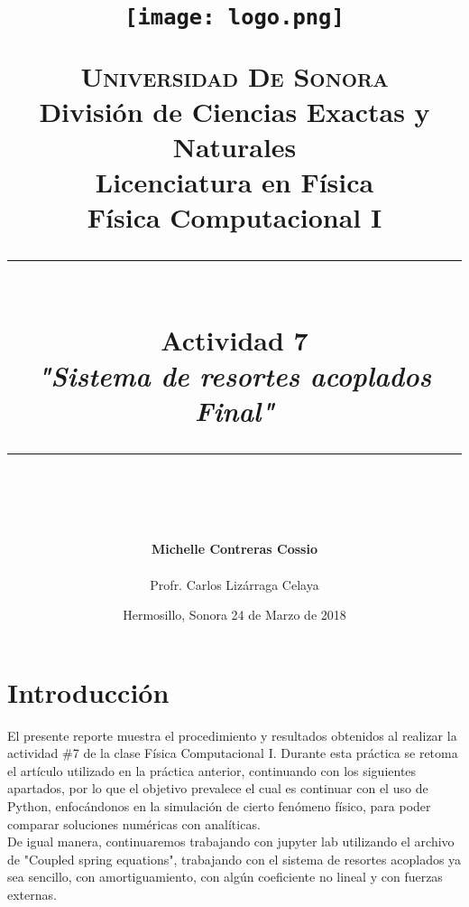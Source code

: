 \documentclass[12pt]{article}
\newcommand{\HRule}[1]{\rule{\linewidth}{#1}}
\begin{document}
\begin{titlepage}

\title{ \normalsize 
        \begin{center}
        \texttt{[image: logo.png]}
        \end{center}
        \LARGE \textsc{\textbf{Universidad De Sonora}} \\ \bigskip
		\Large División de Ciencias Exactas y Naturales \\
        Licenciatura en Física \\ \bigskip
        \bigskip
        Física Computacional I
		\\ [0.1cm]  
		\HRule{2pt} \\
		\Large \textbf{{Actividad 7}} \\
        \textit{\textbf{"Sistema de resortes acoplados Final"}}
		\HRule{2pt} \\
		\normalsize \vspace*{0.001\baselineskip}}
        
\date{\bigskip \Large Hermosillo, Sonora  \hspace*{\fill}  24 de Marzo de 2018}

        
\author{
		\Large\textbf{ Michelle Contreras Cossio} \\ \bigskip
        \\ \bigskip
       \Large Profr. Carlos Lizárraga Celaya}
       \end{titlepage}
       \maketitle
       

\newpage
\pagestyle{plain}

\section{Introducción}
El presente reporte muestra el procedimiento y resultados obtenidos al realizar la actividad \#7 de la clase Física Computacional I.  Durante esta práctica se retoma el artículo utilizado en la práctica anterior, continuando con los siguientes apartados, por lo que el objetivo prevalece el cual es continuar con el uso de Python, enfocándonos en la simulación de cierto fenómeno físico, para poder comparar soluciones numéricas con analíticas. \\

De igual manera, continuaremos trabajando con jupyter lab utilizando el archivo de "Coupled spring equations", trabajando con el sistema de resortes acoplados ya sea sencillo, con amortiguamiento, con algún coeficiente no lineal y con fuerzas externas.\\
\end{document}
